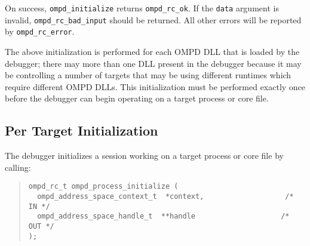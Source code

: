 On success, \texttt{ompd\_initialize} returns \texttt{ompd\_rc\_ok}.
If the \texttt{data} argument is invalid, \texttt{ompd\_rc\_bad\_input}
should be returned.
All other errors will be reported by \texttt{ompd\_rc\_error}.

The above initialization is performed for each OMPD DLL that is loaded by
the debugger; there may more than one DLL present in the debugger
because it may be controlling a number of targets that may be using
different runtimes which require different OMPD DLLs.
This initialization must be performed exactly once before the debugger
can begin operating on a target process or core file.

\subsection{Per Target Initialization}

The debugger initializes a session working on a target process or core
file by calling:
\begin{quote}
\begin{lstlisting}
ompd_rc_t ompd_process_initialize (
  ompd_address_space_context_t  *context,                   /* IN */
  ompd_address_space_handle_t  **handle                    /* OUT */
);
\end{lstlisting}
\end{quote}



